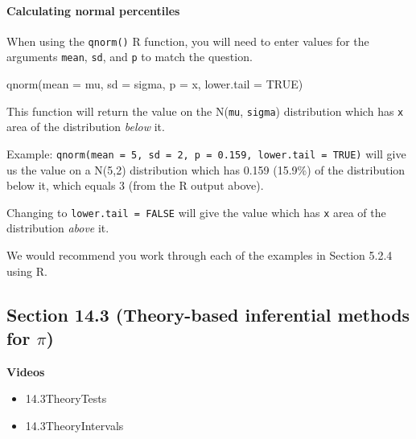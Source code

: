\documentclass[
]{report}
\newenvironment{Shaded}{\begin{snugshade}}{\end{snugshade}}
\newcommand{\AttributeTok}[1]{\textcolor[rgb]{0.77,0.63,0.00}{#1}}
\newcommand{\ConstantTok}[1]{\textcolor[rgb]{0.00,0.00,0.00}{#1}}
\newcommand{\FunctionTok}[1]{\textcolor[rgb]{0.00,0.00,0.00}{#1}}
\newcommand{\NormalTok}[1]{#1}
\providecommand{\tightlist}{%
  \setlength{\itemsep}{0pt}\setlength{\parskip}{0pt}}
\begin{document}
\hypertarget{calculating-normal-percentiles}{%
\paragraph*{Calculating normal percentiles}\label{calculating-normal-percentiles}}

When using the \texttt{qnorm()} R function, you will need to enter values for the arguments \texttt{mean}, \texttt{sd}, and \texttt{p} to match the question.

\begin{Shaded}
\begin{Highlighting}[]
\FunctionTok{qnorm}\NormalTok{(}\AttributeTok{mean =}\NormalTok{ mu, }\AttributeTok{sd =}\NormalTok{ sigma, }\AttributeTok{p =}\NormalTok{ x, }\AttributeTok{lower.tail =} \ConstantTok{TRUE}\NormalTok{)}
\end{Highlighting}
\end{Shaded}

This function will return the value on the N(\texttt{mu}, \texttt{sigma}) distribution which has \texttt{x} area of the distribution \emph{below} it.

Example: \texttt{qnorm(mean\ =\ 5,\ sd\ =\ 2,\ p\ =\ 0.159,\ lower.tail\ =\ TRUE)} will give us the value on a N(5,2) distribution which has 0.159 (15.9\%) of the distribution below it, which equals 3 (from the R output above).

Changing to \texttt{lower.tail\ =\ FALSE} will give the value which has \texttt{x} area of the distribution \emph{above} it.

We would recommend you work through each of the examples in Section 5.2.4 using R.

\hypertarget{section-14.3-theory-based-inferential-methods-for-pi}{%
\subsection*{\texorpdfstring{Section 14.3 (Theory-based inferential methods for \(\pi\))}{Section 14.3 (Theory-based inferential methods for \textbackslash pi)}}\label{section-14.3-theory-based-inferential-methods-for-pi}}


\textbf{Videos}

\begin{itemize}
\tightlist
\item
  14.3TheoryTests
\item
  14.3TheoryIntervals
\end{itemize}
\end{document}
